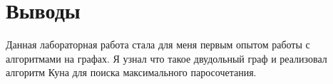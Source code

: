 \section{Выводы}
Данная лабораторная работа стала для меня первым опытом работы с алгоритмами на графах. Я узнал что такое двудольный граф и реализовал алгоритм Куна для поиска максимального паросочетания.

\pagebreak

